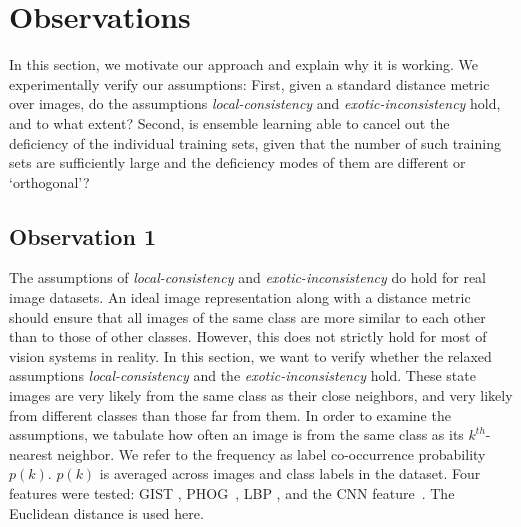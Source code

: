 


\section{Observations}
\label{sec:observations}

\label{sec:observation} In this section, we motivate our approach and explain why it is
working. We experimentally verify our assumptions: First, given a
standard distance metric over images, do the assumptions
\emph{local-con\-sist\-ency} and \emph{exotic-incon\-sistency}
hold, and to what extent? Second, is ensemble learning able to cancel
out the deficiency of the individual training sets, given that the
number of such training sets are sufficiently large and the deficiency
modes of them are different or `orthogonal'?

\subsection{Observation 1}
\label{sec:mov1}
The assumptions of \emph{local-consistency} and
\emph{exotic-inconsist\-ency} do hold for real image datasets.  An
ideal image representation along with a distance metric should ensure
that all images of the same class are more similar to each other
than to those of other classes. However, this does not strictly hold for
most of vision systems in reality. In this section, we want to verify
whether the relaxed assumptions 
\emph{local-consistency} and the \emph{exotic-inconsistency} hold. 
These state images are very likely from the same class as their close
neighbors, and very likely from different classes than those far from them. 
In order to examine the assumptions, we tabulate how often an
image is from the same class as its $k^{th}$-nearest neighbor.  We
refer to the frequency as label co-occurrence probability $p(k)$.
$p(k)$ is averaged across images and class labels in the dataset. Four
features were tested: GIST \citep{gist}, PHOG~\citep{Bosch:iccv07},
LBP \citep{Ojala02}, and the CNN feature~\citep{deep:bmvc14}. 
The Euclidean distance is used here.

